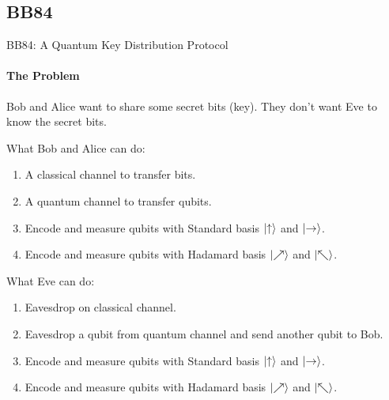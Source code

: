 \documentclass{beamer}
\begin{document}
\subsection{BB84}
\begin{frame}{BB84: A Quantum Key Distribution Protocol}
  \framesubtitle{The Problem}
  Bob and Alice want to share some secret bits (key). They don't want Eve to know the secret bits.
  \begin{block}{What Bob and Alice can do:}
  {\scriptsize
    \begin{enumerate}[I]
      \item A classical channel to transfer bits.
      \item A quantum channel to transfer qubits.
      \item Encode and measure qubits with Standard basis $\ket{\uparrow}$ and $\ket{\rightarrow}$.
      \item Encode and measure qubits with Hadamard basis $\ket{\nearrow}$ and $\ket{\nwarrow}$.
    \end{enumerate}
  }%
  \end{block}
  \begin{block}{What Eve can do:}
  {\scriptsize
    \begin{enumerate}[I]
      \item Eavesdrop on classical channel.
      \item Eavesdrop a qubit from quantum channel and send another qubit to Bob.
      \item Encode and measure qubits with Standard basis $\ket{\uparrow}$ and $\ket{\rightarrow}$.
      \item Encode and measure qubits with Hadamard basis $\ket{\nearrow}$ and $\ket{\nwarrow}$.
    \end{enumerate}
  }%
  \end{block}
\end{frame}
\end{document}
